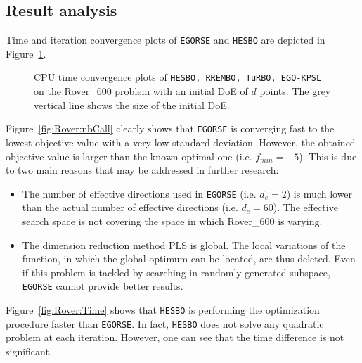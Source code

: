 \subsection{Result analysis}
Time and iteration convergence plots of  \texttt{EGORSE} and  \texttt{HESBO} are depicted in Figure~\ref{fig:Rover}.
\begin{figure}[!hbt]
    \centering
    \caption{CPU time convergence plots of  \texttt{HESBO, RREMBO, TuRBO, EGO-KPSL} on the Rover\_600 problem with an initial DoE of $d$ points. The grey vertical line shows the size of the initial DoE.}
    \label{fig:Rover}
\end{figure}
Figure~\ref{fig:Rover:nbCall} clearly shows that  \texttt{EGORSE} is converging fast to the lowest objective value with  a very low standard deviation. 
However, the obtained objective value is larger than the known optimal one (i.e. $f_{min}=-5$).
This is due to two main reasons that may be addressed in further research:
\begin{itemize}
    \item The number of effective directions used in  \texttt{EGORSE} (i.e. $d_e=2$) is much lower than the actual number of effective directions (i.e. $d_e=60$). The effective search space is not covering the space in which Rover\_600 is varying.
    \item The dimension reduction method PLS is global. The local variations of the function, in which the global optimum can be located, are thus deleted. Even if this problem is tackled by searching in randomly generated subspace,  \texttt{EGORSE} cannot provide better results. 
\end{itemize}
Figure~\ref{fig:Rover:Time} shows that  \texttt{HESBO} is performing the optimization procedure faster than  \texttt{EGORSE}.
In fact,  \texttt{HESBO} does not solve any quadratic problem at each iteration.
However, one can see that the time difference is not significant.